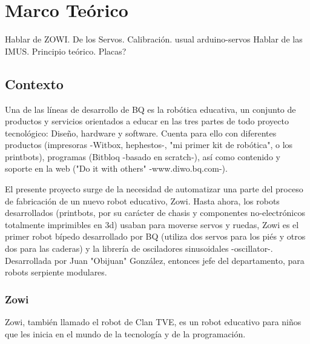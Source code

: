 
\chapter{Marco Teórico} %

\label{Chapter2} %


Hablar de ZOWI.
De los Servos.
Calibración. usual arduino-servos
Hablar de las IMUS. Principio teórico.
Placas?

\section{Contexto}

Una de las líneas de desarrollo de BQ es la robótica educativa, un conjunto de productos y servicios orientados a educar en las tres partes de todo proyecto tecnológico: Diseño, hardware y software. Cuenta para ello con diferentes productos (impresoras -Witbox, hephestos-, "mi primer kit de robótica", o los printbots), programas (Bitbloq -basado en scratch-), así como contenido y soporte en la web ("Do it with others" -www.diwo.bq.com-).

El presente proyecto surge de la necesidad de automatizar una parte del proceso de fabricación de un nuevo robot educativo, Zowi. Hasta ahora, los robots desarrollados (printbots, por su carácter de chasis y componentes no-electrónicos totalmente imprimibles en 3d) usaban para moverse servos y ruedas, Zowi es el primer robot bípedo desarrollado por BQ (utiliza dos servos para los piés y otros dos para las caderas) y la librería de osciladores sinusoidales -oscillator-. Desarrollada por Juan "Obijuan" González, entonces jefe del departamento, para robots serpiente modulares.

\subsection{Zowi}
Zowi, también llamado el robot de Clan TVE, es un robot educativo para niños que les inicia en el mundo de la tecnología y de la programación.

